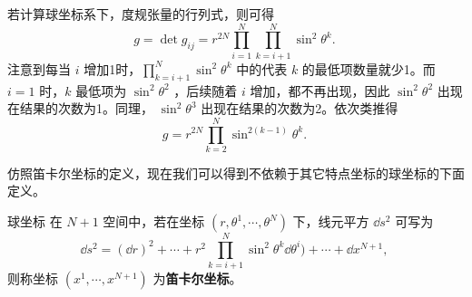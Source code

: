 若计算球坐标系下，度规张量的行列式，则可得
\begin{equation}
g=\det{g_{ij}}=r^{2N}\prod_{i=1}^N\prod\limits_{k=i+1}^{N}\sin^2\theta^{k}.~
\end{equation}
注意到每当 $i$ 增加1时，$\prod\limits_{k=i+1}^{N}\sin^2\theta^{k}$ 中的代表 $k$ 的最低项数量就少1。而 $i=1$ 时，$k$ 最低项为 $\sin ^2\theta^2$ ，后续随着 $i$ 增加，都不再出现，因此 $\sin ^2\theta^2$ 出现在结果的次数为1。同理， $\sin ^2\theta^3$ 出现在结果的次数为2。依次类推得
\begin{equation}
g=r^{2N}\prod\limits_{k=2}^{N}\sin^{2(k-1)}\theta^{k}.~
\end{equation}

仿照笛卡尔坐标的定义，现在我们可以得到不依赖于其它特点坐标的球坐标的下面定义。
\begin{definition}{球坐标}
在 $N+1$ 空间中，若在坐标 $(r,\theta^1,\cdots,\theta^{N})$ 下，线元平方 $\dd s^2$ 可写为
\begin{equation}\label{eq_nDSM_2}
\dd s^2=(\dd r)^2+\cdots+r^2\prod\limits_{k=i+1}^{N}\sin^2\theta^{k}\dd\theta^i)+\cdots+\dd x^{N+1},~
\end{equation}
 则称坐标 $(x^1,\cdots,x^{N+1})$ 为\textbf{笛卡尔坐标}。
\end{definition}


























